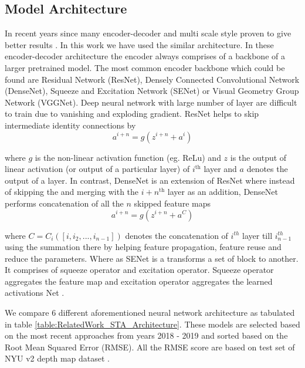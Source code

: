 \subsection{Model Architecture}
\label{Chapter3:ModelArch}
In recent years since many encoder-decoder and multi scale style proven to give better results \cite{Alhashim2018, hu2019revisiting}. In this work we have used the similar architecture. In these encoder-decoder architecture the encoder always comprises of a backbone of a larger pretrained model. The most common encoder backbone which could be found are Residual Network (ResNet), Densely Connected Convolutional Network (DenseNet), Squeeze and Excitation Network (SENet) or Visual Geometry Group Network (VGGNet)\cite{hu2019revisiting}. Deep neural network with large number of layer are difficult to train due to vanishing and exploding gradient. ResNet helps to skip intermediate identity connections by 
\begin{equation} \label{eqResNet}
    {a^{i+n}=g(z^{i+n} + a^i)}
\end{equation}


where \(g\) is the non-linear activation function (eg. ReLu) and \(z\) is the output of linear activation (or output of a particular layer) of $i^{\text{th}}$ layer and \(a\) denotes the output of a layer. In contrast, DenseNet is an extension of ResNet where instead of skipping the and merging with the $i+n^{\text{th}}$ layer as an addition, DenseNet performs concatenation of all the $n$ skipped feature maps
\begin{equation} \label{eqDenseNet}
    {a^{i+n}=g(z^{i+n} + a^{C})}
\end{equation}


where \({C =C_i([i,i_2,...,i_{n-1}])}\) denotes the concatenation of \(i^{th}\) layer till \(i_{n-1}^{th}\) using the summation \cite{huang2017densely} there by helping feature propagation, feature reuse and  reduce the parameters. Where as SENet is a transforms a set of block to another. It comprises of squeeze operator and excitation operator. Squeeze operator aggregates the feature map and excitation operator  aggregates the learned activations Net \cite{iandola2016squeezenet}. 


We compare 6 different aforementioned neural network architecture as tabulated in table \ref{table:RelatedWork_STA_Architecture}. These models are selected based on the most recent approaches from years  2018 - 2019 and sorted based on the Root Mean Squared Error (RMSE). All the RMSE score are based on test set of NYU v2 depth map dataset \cite{silberman11indoor}.

